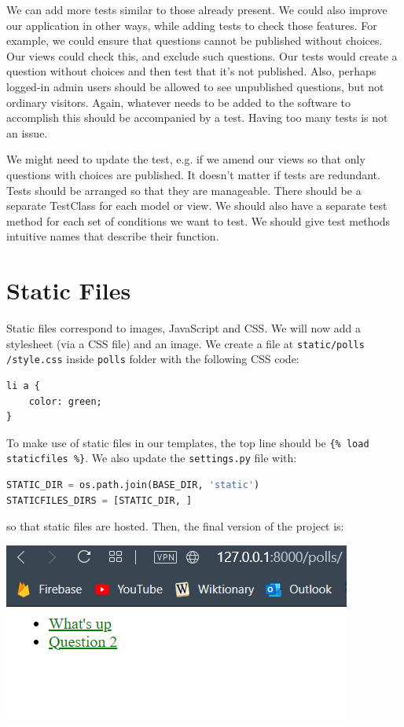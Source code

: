 \documentclass[a4paper, openany]{memoir}
\begin{document}
    We can add more tests similar to those already present. We could also improve our application in other ways, while adding tests to check those features. For example, we could ensure that questions cannot be published without choices. Our views could check this, and exclude such questions. Our tests would create a question without choices and then test that it's not published. Also, perhaps logged-in admin users should be allowed to see unpublished questions, but not ordinary visitors. Again, whatever needs to be added to the software to accomplish this should be accompanied by a test. Having too many tests is not an issue.

    We might need to update the test, e.g. if we amend our views so that only questions with choices are published. It doesn't matter if tests are redundant. Tests should be arranged so that they are manageable. There should be a separate TestClass for each model or view. We should also have a separate test method for each set of conditions we want to test. We should give test methods intuitive names that describe their function.
    \newpage

    \section{Static Files}
    Static files correspond to images, JavaScript and CSS. We will now add a stylesheet (via a CSS file) and an image. We create a file at \texttt{static/polls} \texttt{/style.css} inside \texttt{polls} folder with the following CSS code:
\begin{lstlisting}
li a {
    color: green;
}
\end{lstlisting}
    To make use of static files in our templates, the top line should be \texttt{\{\% load staticfiles \%\}}. We also update the \texttt{settings.py} file with:
\begin{lstlisting}[language=python]
STATIC_DIR = os.path.join(BASE_DIR, 'static')
STATICFILES_DIRS = [STATIC_DIR, ]
\end{lstlisting}
    so that static files are hosted. Then, the final version of the project is:
    \begin{center}
        \includegraphics[scale=0.6]{src/Django12.PNG}
    \end{center}
\end{document}

